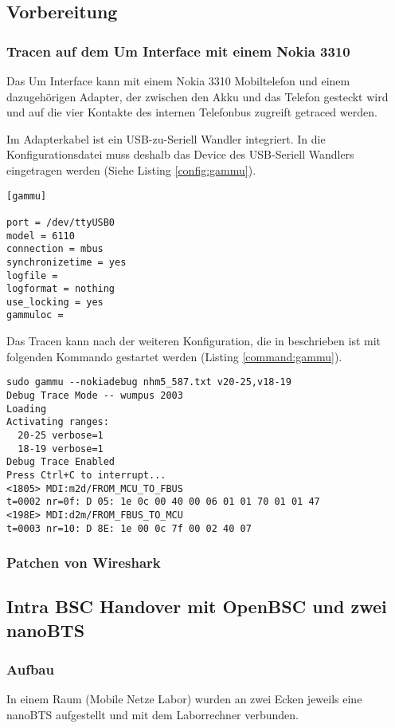 \label{sec:analyse}

\subsection{Vorbereitung}
\subsubsection{Tracen auf dem Um Interface mit einem Nokia 3310}
Das Um Interface kann mit einem Nokia 3310 Mobiltelefon und einem dazugehörigen Adapter, der zwischen den Akku und das Telefon gesteckt wird und auf die vier Kontakte des internen Telefonbus zugreift getraced werden.

Im Adapterkabel ist ein USB-zu-Seriell Wandler integriert. In die Konfigurationsdatei muss deshalb das Device des USB-Seriell Wandlers eingetragen werden (Siehe Listing \ref{config:gammu}).

\begin{lstlisting}[label=config:gammu,caption={Konfigurationsdatei für gammu und dem verwendeten Adapter}]
[gammu]

port = /dev/ttyUSB0
model = 6110
connection = mbus
synchronizetime = yes
logfile = 
logformat = nothing
use_locking = yes
gammuloc = 
\end{lstlisting}

Das Tracen kann nach der weiteren Konfiguration, die in \cite{bib:nokiagammu} beschrieben ist mit folgenden Kommando gestartet werden (Listing \ref{command:gammu}).

\begin{lstlisting}[label=command:gammu,caption={Aufruf von Gammu}]
sudo gammu --nokiadebug nhm5_587.txt v20-25,v18-19
Debug Trace Mode -- wumpus 2003
Loading
Activating ranges:
  20-25 verbose=1
  18-19 verbose=1
Debug Trace Enabled
Press Ctrl+C to interrupt...
<1805> MDI:m2d/FROM_MCU_TO_FBUS
t=0002 nr=0f: D 05: 1e 0c 00 40 00 06 01 01 70 01 01 47 
<198E> MDI:d2m/FROM_FBUS_TO_MCU
t=0003 nr=10: D 8E: 1e 00 0c 7f 00 02 40 07 
\end{lstlisting}

\subsubsection{Patchen von Wireshark}

\subsection{Intra BSC Handover mit OpenBSC und zwei nanoBTS}


\subsubsection{Aufbau}
In einem Raum (Mobile Netze Labor) wurden an zwei Ecken jeweils eine nanoBTS aufgestellt und mit dem Laborrechner verbunden. 
